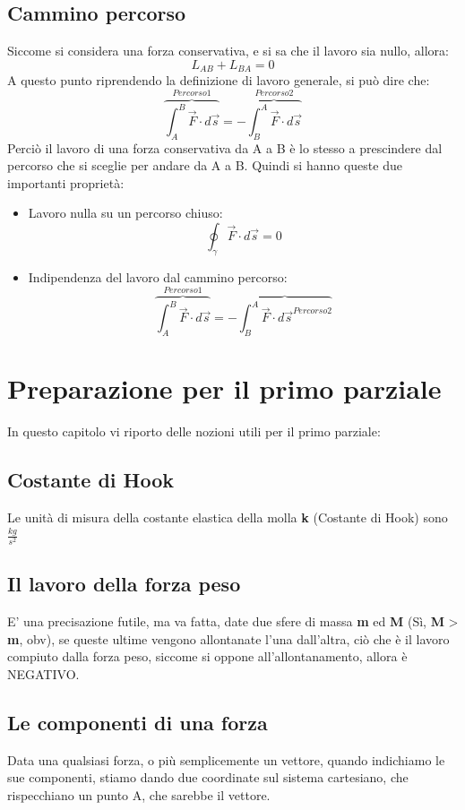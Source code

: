 \documentclass[12pt, a4paper, openany, oneside]{book}
\begin{document}
\section{Cammino percorso}
Siccome si considera una forza conservativa, e si sa che il lavoro sia nullo, 
allora: 
\[
	L_{AB} + L_{BA} = 0
\]	
A questo punto riprendendo la definizione di lavoro generale, si può
dire che: 
\[
\overbrace{\int_{A}^{B} \overrightarrow{F} \cdot d \overrightarrow{s}}^{Percorso 1}
 = - \overbrace{\int_{B}^{A} \overrightarrow{F} \cdot d \overrightarrow{s}}^{Percorso 2}
\]    
Perciò il lavoro di una forza conservativa da A a B è lo stesso a prescindere dal 
percorso che si sceglie per andare da A a B. Quindi si hanno queste due 
importanti proprietà: 
\begin{itemize}
	\item Lavoro nulla su un percorso chiuso: 
	\[
	\oint_{\gamma} \overrightarrow{F} \cdot d\overrightarrow{s} = 0
	\]
	\item Indipendenza del lavoro dal cammino percorso: 
	\[
	\overbrace{\int_{A}^{B} \overrightarrow{F} \cdot d \overrightarrow{s}}^{Percorso 1}
	 = - \overbrace{\int_{B}^{A} \overrightarrow{F} \cdot d \overrightarrow{s}^{Percorso 2}}
	\]    
\end{itemize}
\chapter{Preparazione per il primo parziale}
In questo capitolo vi riporto delle nozioni utili per il primo parziale:
\section{Costante di Hook}
Le unità di misura della costante elastica della molla \textbf{k} (Costante di 
Hook) sono $\frac{kg}{s^{2}}$ 
\section{Il lavoro della forza peso}
E' una precisazione futile, ma va fatta, date due sfere di massa \textbf{m} ed 
\textbf{M} (Sì, \textbf{M} > \textbf{m}, obv), se queste ultime vengono allontanate
l'una dall'altra, ciò che è il lavoro compiuto dalla forza peso, siccome si 
oppone all'allontanamento, allora è NEGATIVO.
\section{Le componenti di una forza}
Data una qualsiasi forza, o più semplicemente un vettore, quando indichiamo le 
sue componenti, stiamo dando due coordinate sul sistema cartesiano, che rispecchiano
un punto A, che sarebbe il vettore. 
\end{document}
